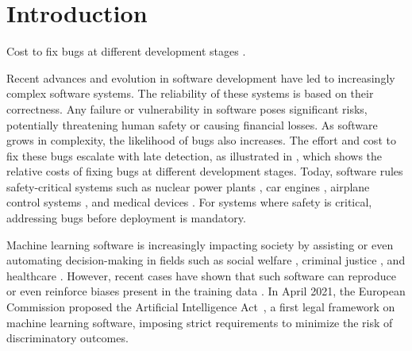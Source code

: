 

\chapter{Introduction}

\begin{margintable}[*8.5]
  \caption{Cost to fix bugs at different development stages \cite{White2017}.}
  \centering
\end{margintable}

Recent advances and evolution in software development have led to increasingly complex software systems.
The reliability of these systems is based on their correctness.
Any failure or vulnerability in software poses significant risks, potentially threatening human safety or causing financial losses.
As software grows in complexity, the likelihood of bugs also increases.
The effort and cost to fix these bugs escalate with late detection, as illustrated in  , which shows the relative costs of fixing bugs at different development stages.
Today, software rules safety-critical systems such as nuclear power plants ,
car engines ,
airplane control systems
,
and medical devices .
For systems where safety is critical, addressing bugs before deployment is mandatory.

Machine learning software is increasingly impacting society by assisting or even automating decision-making in fields such as social welfare , criminal justice , and healthcare .
However, recent cases have shown that such software can reproduce or even reinforce biases present in the training data \cite{Buolamwini2018,Kay2015,Larson2016,Obermeyer2019}.
In April 2021, the European Commission proposed the Artificial Intelligence Act~, a first legal framework on machine learning software, imposing strict requirements to minimize the risk of discriminatory outcomes.


